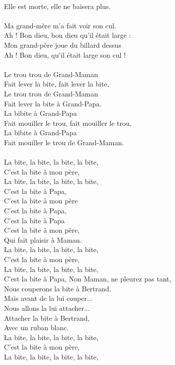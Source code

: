 \\Elle est morte, elle ne baisera plus.
\\\\Ma grand-mère m'a fait voir son cul.
\\Ah ! Bon dieu, bon dieu qu'il était large :
\\Mon grand-père joue du billard dessus
\\Ah ! Bon dieu, qu'il était large son cul !
\\\\Le trou trou de Grand-Maman
\\Fait lever la bite, fait lever la bite,
\\Le trou trou de Grand-Maman
\\Fait lever la bite à Grand-Papa.
\\La bibite à Grand-Papa
\\Fait mouiller le trou, fait mouiller le trou,
\\La bibite à Grand-Papa
\\Fait mouiller le trou de Grand-Maman.
\\\\La bite, la bite, la bite, la bite, 
\\C'est la bite à mon père,
\\La bite, la bite, la bite, la bite, 
\\C'est la bite à Papa,
\\C'est la bite à mon père
\\C'est la bite à Papa,
\\C'est la bite à Papa
\\C'est la bite à mon père,
\\Qui fait plaisir à Maman.
\\La bite, la bite, la bite, la bite,
\\C'est la bite à mon père,
\\La bite, la bite, la bite, la bite,
\\C'est la bite à Papa,
\breakpage
Non Maman, ne pleurez pas tant,
\\Nous couperons la bite à Bertrand.
\\Mais avant de la lui couper...
\\Nous allons la lui attacher...
\\Attacher la bite à Bertrand,
\\Avec un ruban blanc.
\\La bite, la bite, la bite, la bite, 
\\C'est la bite à mon père,
\\La bite, la bite, la bite, la bite, 
